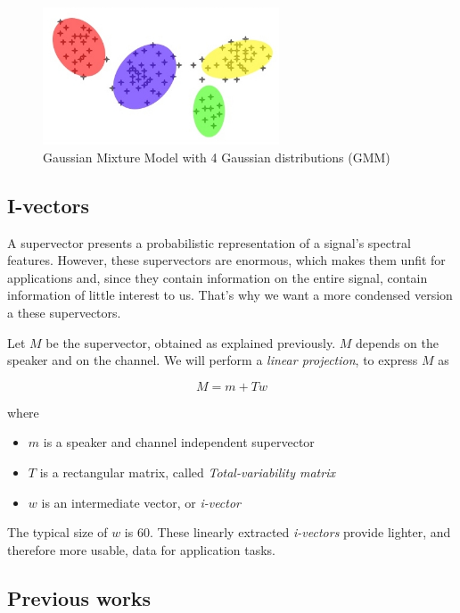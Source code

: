 \documentclass[conference]{IEEEtran}
\begin{document}
\begin{figure}[!h]
    \centering
    \includegraphics[width=7cm]{GMM.jpg}
    \caption{Gaussian Mixture Model with 4 Gaussian distributions (GMM)}
    \label{gmm}
\end{figure}

\subsection{I-vectors}

A supervector presents a probabilistic representation of a signal's spectral features.
However, these supervectors are enormous, which makes them unfit for
applications and, since they contain information on the entire signal, contain
information of little interest to us.
That's why we want a more condensed version a these supervectors.


Let $M$ be the supervector, obtained as explained previously. $M$ depends on the speaker and on the channel.
We will perform a \emph{linear projection}, to express $M$ as

\begin{equation}
  M = m + Tw
  \label{eq:i}
\end{equation}

\noindent where
\begin{itemize}
\item $m$ is a speaker and channel independent supervector
\item $T$ is a rectangular matrix, called \emph{Total-variability matrix}
\item $w$ is an intermediate vector, or \emph{i-vector}
\end{itemize}

The typical size of $w$ is $60$. These linearly extracted \emph{i-vectors} provide lighter, and therefore more usable, data for application tasks.

\subsection{Previous works}
\end{document}
